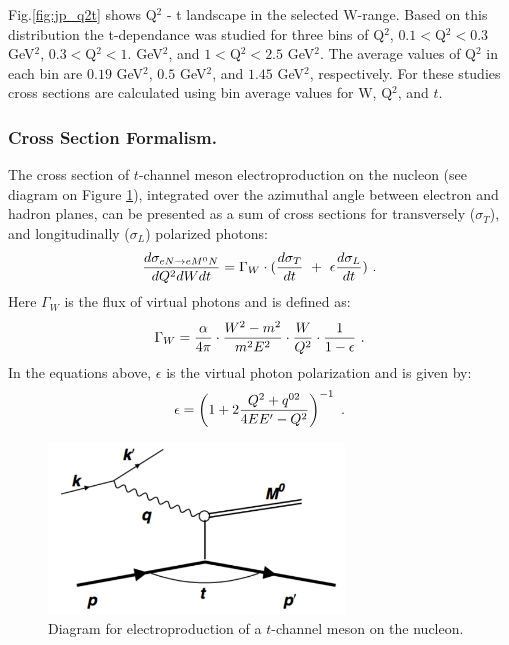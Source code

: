 Fig.\ref{fig:jp_q2t} shows Q$^2$ - t landscape in the selected W-range. Based on this distribution the t-dependance was studied for three bins of Q$^2$, $0.1<$Q$^2 <0.3$ GeV$^2$, $0.3<$Q$^2 <1.$ GeV$^2$, and $1<$Q$^2 < 2.5$ GeV$^2$. The average values of Q$^2$ in each bin are $0.19$ GeV$^2$,  $0.5$ GeV$^2$, and $1.45$ GeV$^2$, respectively. For these studies cross sections are calculated using bin average values for W, Q$^2$, and $t$.


\subsubsection{Cross Section Formalism.}
\indent

The cross section of $t$-channel meson electroproduction on the
nucleon (see diagram on Figure \ref{fig:diagn}), integrated over the
azimuthal angle between electron and hadron planes, can be presented 
as a sum of cross sections for transversely ($\sigma_T$), and
longitudinally ($\sigma_L$) polarized photons: 
\begin{eqnarray}
\label{eq:cse}
{d\sigma _{eN \rightarrow eM^0 N}  \over dQ^2dWdt}=
\Gamma_W\cdot ({d\sigma_T \over dt}~+~\epsilon{d\sigma_L \over dt}) \ .
\end{eqnarray}
Here $\Gamma_W$ is the flux of virtual photons and is defined as:
\begin{eqnarray}
\label{eq:flux}
\Gamma_W=
{\alpha\over 4\pi}\cdot{W^2-m^2\over m^2E^2}\cdot{W\over Q^2}\cdot 
{1\over 1-\epsilon}  \ .
\end{eqnarray}
In the equations above, $\epsilon$ is the virtual photon polarization and is
given by:
\begin{eqnarray}
\label{eq:eps}
\epsilon = \left( 1+2{Q^2+q^{02}\over 4EE'-Q^2} \right)^{-1} \ .
\end{eqnarray}
\begin{figure}[htbp]
\begin{center} 
\includegraphics[width=0.7\textwidth]{ep_pm0.pdf}
\caption{Diagram for electroproduction of a $t$-channel meson on the nucleon.}
\label{fig:diagn}
\end{center}
\end{figure}

